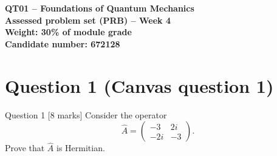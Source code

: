 \documentclass[12pt]{article}
\begin{document}
\begin{center}
{\Large\bfseries QT01 -- Foundations of Quantum Mechanics\\[0.2em]
Assessed problem set (PRB) -- Week 4\\[0.3em]
{\normalsize Weight: 30\% of module grade}\\[1em]
Candidate number: 672128
}
\end{center}


\section{Question 1 (Canvas question 1)}
\begin{problembox}{Question 1 \hfill [8 marks]}
Consider the operator
\[
    \hat{A} = \begin{pmatrix} -3 & 2i \\ -2i & -3 \end{pmatrix}.
\]
Prove that \( \hat{A} \) is Hermitian.
\end{problembox}
\end{document}
